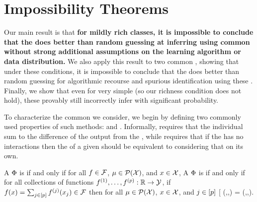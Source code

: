 %

\section{Impossibility Theorems}\label{sec:impossibility}

Our main result is that \textbf{for mildly rich \modelname{} classes, it is impossible to conclude that the \username{} does better than random guessing at inferring \countmodbehaviourname{} using common \fielddefnames{} without strong additional assumptions on the learning algorithm or data distribution.}
We also apply this result to two common \downtasknames{}, showing that under these conditions, it is impossible to conclude that the \username{} does better than random guessing for algorithmic recourse and spurious \covname{} identification using these \fielddefnames{}.
Finally, we show that even for very simple \modelnames{} (so our richness condition does not hold), these \fielddefnames{} provably still incorrectly infer \countmodbehaviourname{} with significant probability.
%
%
%

To characterize the common \fielddefnames{} we consider, we begin by defining two commonly used properties of such methods: \emph{\completenames{}} and \emph{\additivenames{}}.
Informally, \completenames{} requires that the individual \covname{} \attnames{} sum to the difference of the \modelname{} output from the \basename{}, while \additivenames{} requires that if the \modelname{} has no \covname{} interactions then the \attnames{} of a given \covname{} should be equivalent to considering that \covname{} on its own. 

\begin{definition}[\completeName{}]\label{defn:complete}
A \fielddefname{}
$\Phi$ is \emph{\completename{}} if and only if
for all
\modelnames{} $f\in\mathcal{F}$,
\basenames{} $\mu\in\mathcal{P}(\mathcal{X})$,
and
\obsnames{} $x\in\mathcal{X}$,
%
%
%
%
\*[
    \sum_{j\in[\covdim]}\expdef(\model,\covdist,\covval)\feat{j}
    = \model(\covval) - \EE_{\covobs\sim\covdist} \model(\covobs).
\]
\end{definition}

\begin{definition}[\additiveName{}]\label{defn:additive}
A \fielddefname{}
$\Phi$ is \emph{\additivename{}} if and only if
for all collections of functions $f^{(1)},\dots,f^{(p)}:\mathbb{R}\to\mathcal{Y}$,
if $f(x) = \sum_{j\in[p]} f^{(j)}(x_{j}) \in \mathcal{F}$ then for all \basenames{} $\mu\in\mathcal{P}(\mathcal{X})$, \obsnames{} $x\in\mathcal{X}$, and \covnames{} $j\in[p]$
%
\*[
    \expdef(\model,\covdist,\covval)
    = \expdef(\model{},\covdist{},\covval{}).
\]
\end{definition}

